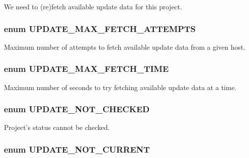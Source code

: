 \label{update_8module_ab6032ea4bca533dbb7ff44187401349b}
We need to (re)fetch available update data for this project. \hypertarget{update_8module_af6288154fbed0f550434f71cf3e547d8}{
\subsubsection[{UPDATE\_\-MAX\_\-FETCH\_\-ATTEMPTS}]{\setlength{\rightskip}{0pt plus 5cm}enum {\bf UPDATE\_\-MAX\_\-FETCH\_\-ATTEMPTS}}}
\label{update_8module_af6288154fbed0f550434f71cf3e547d8}
Maximum number of attempts to fetch available update data from a given host. \hypertarget{update_8module_a9975bc9775cebdd7922532339997220a}{
\subsubsection[{UPDATE\_\-MAX\_\-FETCH\_\-TIME}]{\setlength{\rightskip}{0pt plus 5cm}enum {\bf UPDATE\_\-MAX\_\-FETCH\_\-TIME}}}
\label{update_8module_a9975bc9775cebdd7922532339997220a}
Maximum number of seconds to try fetching available update data at a time. \hypertarget{update_8module_a322f30231755ebbc7b4a8be77e574a43}{
\subsubsection[{UPDATE\_\-NOT\_\-CHECKED}]{\setlength{\rightskip}{0pt plus 5cm}enum {\bf UPDATE\_\-NOT\_\-CHECKED}}}
\label{update_8module_a322f30231755ebbc7b4a8be77e574a43}
Project's status cannot be checked. \hypertarget{update_8module_a1cf8c4b62d552b0c62ae317040760744}{
\subsubsection[{UPDATE\_\-NOT\_\-CURRENT}]{\setlength{\rightskip}{0pt plus 5cm}enum {\bf UPDATE\_\-NOT\_\-CURRENT}}}
